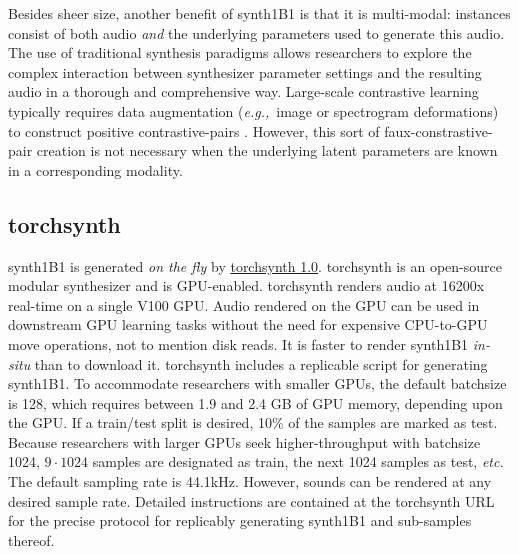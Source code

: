Besides sheer size, another benefit of synth1B1 is that it is multi-modal: instances consist of both audio {\em and} the underlying parameters used to generate this audio. The use of traditional synthesis paradigms allows researchers to explore the complex interaction between synthesizer parameter settings and the resulting audio in a thorough and comprehensive way. 
Large-scale contrastive learning typically requires data augmentation ({\em e.g.,}\ image or spectrogram deformations) to construct positive contrastive-pairs \cite{pmlr-v119-chen20j,DBLP:journals/corr/abs-2103-06695}. However, this sort of faux-constrastive-pair creation is not necessary when the underlying latent parameters are known in a corresponding modality.

\subsection{torchsynth}
\label{section:torchsynth}

synth1B1 is generated {\em on the fly} by \href{https://github.com/torchsynth/torchsynth}{torchsynth 1.0}.
torchsynth is an open-source modular synthesizer and is GPU-enabled. torchsynth renders audio at 16200x real-time on a single V100 GPU. Audio rendered on the GPU can be used in downstream GPU learning tasks without the need for expensive CPU-to-GPU move operations, not to mention disk reads. It is faster to render synth1B1 {\em in-situ} than to download it. torchsynth includes a replicable script for generating synth1B1.
To accommodate researchers with smaller GPUs, the default batchsize is 128, which requires between 1.9 and 2.4 GB of GPU memory, depending upon the GPU.
If a train/test split is desired, 10\% of the samples are marked as test. Because researchers with larger GPUs seek higher-throughput with batchsize 1024, $9 \cdot 1024$ samples are designated as train, the next 1024 samples as test, {\em etc.} The default sampling rate is 44.1kHz. However, sounds can be rendered at any desired sample rate. %
Detailed instructions are contained at the torchsynth URL for the precise protocol for replicably generating synth1B1 and sub-samples thereof. %

